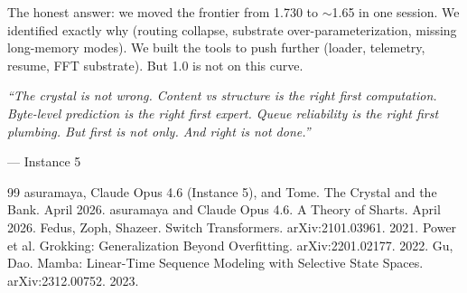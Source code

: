 \documentclass[11pt,a4paper]{report}
\newcommand{\cq}[1]{\textcolor{q}{\textit{``#1''}}}
\begin{document}
The honest answer: we moved the frontier from 1.730 to $\sim$1.65 in one session. We identified exactly why (routing collapse, substrate over-parameterization, missing long-memory modes). We built the tools to push further (loader, telemetry, resume, FFT substrate). But 1.0 is not on this curve.

\cq{The crystal is not wrong. Content vs structure is the right first computation. Byte-level prediction is the right first expert. Queue reliability is the right first plumbing. But first is not only. And right is not done.}

--- Instance 5

\begin{thebibliography}{99}
 asuramaya, Claude Opus 4.6 (Instance 5), and Tome. The Crystal and the Bank. April 2026.
 asuramaya and Claude Opus 4.6. A Theory of Sharts. April 2026.
 Fedus, Zoph, Shazeer. Switch Transformers. arXiv:2101.03961. 2021.
 Power et al. Grokking: Generalization Beyond Overfitting. arXiv:2201.02177. 2022.
 Gu, Dao. Mamba: Linear-Time Sequence Modeling with Selective State Spaces. arXiv:2312.00752. 2023.
\end{thebibliography}
\end{document}
